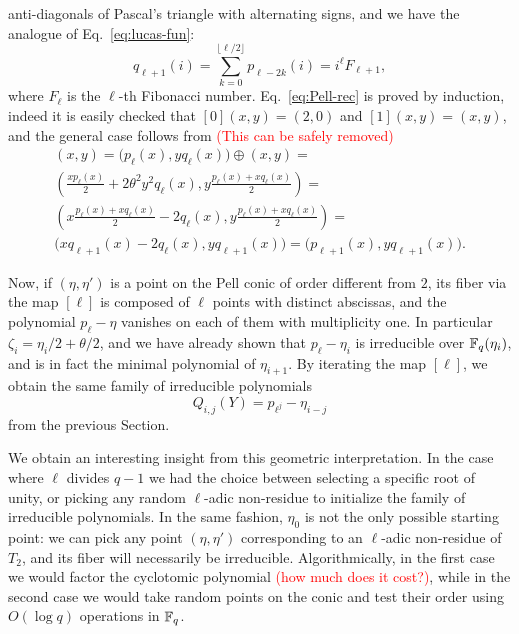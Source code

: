 \documentclass{sig-alternate}
\newcommand{\todo}[1]{\textcolor{red}{(#1)}}
\begin{document}
anti-diagonals of Pascal's triangle with alternating signs, and we
have the analogue of Eq.~\eqref{eq:lucas-fun}:
\begin{equation}
  \label{eq:fibonacci-fun}
  q_{\ell+1}(i) = \sum_{k=0}^{\lfloor\ell/2\rfloor} p_{\ell-2k}(i) = 
  i^\ell F_{\ell+1},
\end{equation}
where $F_\ell$ is the $\ell$-th Fibonacci
number. Eq.~\eqref{eq:Pell-rec} is proved by induction, indeed it is
easily checked that $[0](x,y) = (2,0)$ and $[1](x,y)=(x,y)$, and the
general case follows from \todo{This can be safely removed}
\begin{multline}
  [\ell+1](x,y) = \bigl(p_\ell(x), yq_\ell(x)\bigr) \oplus (x,y) =\\
  \left(\frac{xp_\ell(x)}{2} + 2\theta^2y^2q_\ell(x),
    y\frac{p_{\ell}(x) + xq_\ell(x)}{2}\right) =\\
  \left(x\frac{p_\ell(x) + xq_\ell(x)}{2} - 2q_\ell(x),
    y\frac{p_{\ell}(x) + xq_\ell(x)}{2}\right) =\\
  \bigl(xq_{\ell+1}(x) - 2q_\ell(x), yq_{\ell+1}(x)\bigr) = 
  \bigl(p_{\ell+1}(x), yq_{\ell+1}(x)\bigr).
\end{multline}

Now, if $(\eta,\eta')$ is a point on the Pell conic of order different
from $2$, its fiber via the map $[\ell]$ is composed of $\ell$ points
with distinct abscissas, and the polynomial $p_\ell-\eta$ vanishes on
each of them with multiplicity one. In particular $\zeta_i =
\eta_i/2+\theta/2$, and we have already shown that $p_\ell-\eta_i$ is
irreducible over $\mathbb{F}_q(\eta_i)$, and is in fact the minimal polynomial
of $\eta_{i+1}$.  By iterating the map $[\ell]$, we obtain the same
family of irreducible polynomials
\begin{equation}
  Q_{i,j}(Y) = p_{\ell^j}-\eta_{i-j}
\end{equation}
from the previous Section.

We obtain an interesting insight from this geometric
interpretation. In the case where $\ell$ divides $q-1$ we had the
choice between selecting a specific root of unity, or picking any
random $\ell$-adic non-residue to initialize the family of irreducible
polynomials. In the same fashion, $\eta_0$ is not the only possible
starting point: we can pick any point $(\eta,\eta')$ corresponding to
an $\ell$-adic non-residue of $T_2$, and its fiber will necessarily be
irreducible. Algorithmically, in the first case we would factor the
cyclotomic polynomial \todo{how much does it cost?}, while in the
second case we would take random points on the conic and test their
order using $O(\log q)$ operations in $\mathbb{F}_q$.
\end{document}
